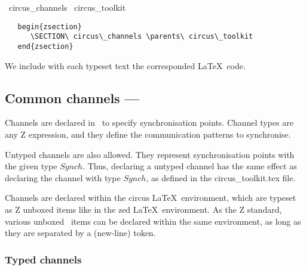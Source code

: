 \documentclass{article}
\begin{document}
\begin{zsection}
  \SECTION\ circus\_channels \parents\ circus\_toolkit
\end{zsection}
%
%
%
\begin{verbatim}
   begin{zsection}
      \SECTION\ circus\_channels \parents\ circus\_toolkit
   end{zsection}
\end{verbatim}
%
We include with each typeset text the corresponded \LaTeX\ code.


\subsection{Common channels --- }

Channels are declared in \Circus\ to specify synchronisation points. Channel
types are any Z expression, and they define the communication patterns to
synchronise.

Untyped channels are also allowed. They represent synchronisation points with
the given type $Synch$. Thus, declaring a untyped channel has the same effect
as declaring the channel with type $Synch$, as defined in the
\textsf{circus\_toolkit.tex} file.

Channels are declared within the \textsf{circus} \LaTeX\ environment, which are
typeset as Z unboxed items like in the \textsf{zed} \LaTeX\ environment. As the
Z standard, various unboxed \Circus\ items can be declared within the same
environment, as long as they are separated by a  (new-line) token.

\subsubsection{Typed channels}
\end{document}
